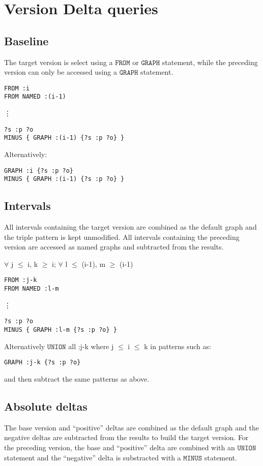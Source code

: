 \section{Version Delta queries}
\subsection{Baseline}
The target version is select using a $\mathtt{FROM}$ or $\mathtt{GRAPH}$ statement, while the preceding version can only be accessed using a $\mathtt{GRAPH}$ statement.
\begin{verbatim}
FROM :i
FROM NAMED :(i-1)
\end{verbatim}
\vdots
\begin{verbatim}
?s :p ?o
MINUS { GRAPH :(i-1) {?s :p ?o} }
\end{verbatim}
Alternatively:
\begin{verbatim}
GRAPH :i {?s :p ?o}
MINUS { GRAPH :(i-1) {?s :p ?o} }
\end{verbatim}


\subsection{Intervals}
All intervals containing the target version are combined as the default graph and the triple pattern is kept unmodified. All intervals containing the preceding version are accessed as named graphs and subtracted from the results.


$\forall$ j $\leq$ i, k $\geq$ i; $\forall$ l $\leq$ (i-1), m $\geq$ (i-1)
\begin{verbatim}
FROM :j-k
FROM NAMED :l-m
\end{verbatim}
\vdots
\begin{verbatim}
?s :p ?o
MINUS { GRAPH :l-m {?s :p ?o} }
\end{verbatim}
Alternatively $\mathtt{UNION}$ all :j-k where j $\leq$ i $\leq$ k in patterns such as:
\begin{verbatim}
GRAPH :j-k {?s :p ?o}
\end{verbatim}
and then subtract the same patterns as above.
\subsection{Absolute deltas}
The base version and ``positive'' deltas are combined as the default graph and the negative deltas are subtracted from the results to build the target version. For the preceding version, the base and ``positive'' delta are combined with an $\mathtt{UNION}$ statement and the ``negative'' delta is substracted with a $\mathtt{MINUS}$ statement.
